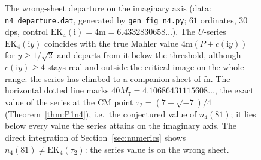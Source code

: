 \documentclass[11pt]{article}
\theoremstyle{definition}
\theoremstyle{remark}
\newcommand{\ii}{\mathrm{i}}
\newcommand{\m}{\mathrm{m}}
\newcommand{\mt}{\widetilde{\m}}
\begin{document}
\begin{figure}[ht]
\centering
{}
\caption{The wrong-sheet departure on the imaginary axis
(data: \texttt{n4\_departure.dat}, generated by
\texttt{gen\_fig\_n4.py}; $61$ ordinates, $30$ dps, control
$\mathrm{EK}_4(\ii)=4\m=6.4332830658\ldots$). The $U$-series
$\mathrm{EK}_4(\ii y)$ coincides with the true Mahler value
$4\m(P+c(\ii y))$ for $y\ge1/\sqrt2$ and departs from it below the
threshold, although $c(\ii y)\ge4$ stays real and outside the critical
image on the whole range: the series has climbed to a companion sheet of
$\mt$. The horizontal dotted line marks
$40M_7=4.10686431115608\ldots$, the exact value of the series at the CM
point $\tau_2=(7+\sqrt{-7})/4$ (Theorem~\ref{thm:P1n4}), i.e.\ the
conjectured value of $n_4(81)$; it lies below every value the series
attains on the imaginary axis. The direct integration of
Section~\ref{sec:numerics} shows $n_4(81)\ne\mathrm{EK}_4(\tau_2)$:
the series value is on the wrong sheet.}
\label{fig:departure}
\end{figure}
\end{document}
